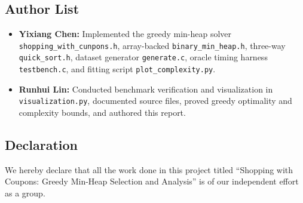 \documentclass[10pt, a4paper]{article}
\newif\ifpeerreview
\newcommand{\code}[1]{\texttt{\color{primary!90!black}#1}}
\begin{document}
\subsection*{Author List}
{\sloppy
\ifpeerreview
\begin{itemize}
  \item \textbf{\color{primary}Student A:} Implemented the greedy min-heap solver \code{shopping\_with\_cunpons.h}, array-backed \code{binary\_min\_heap.h}, three-way \code{quick\_sort.h}, dataset generator \code{generate.c}, oracle timing harness \code{testbench.c}, and fitting script \code{plot\_complexity.py}.
  \item \textbf{\color{primary}Student B:} Conducted benchmark verification and visualization in \code{visualization.py}, documented source files, proved greedy optimality and complexity bounds, and authored this report.
\end{itemize}
\else
\begin{itemize}
  \item \textbf{\color{primary}Yixiang Chen:} Implemented the greedy min-heap solver \code{shopping\_with\_cunpons.h}, array-backed \code{binary\_min\_heap.h}, three-way \code{quick\_sort.h}, dataset generator \code{generate.c}, oracle timing harness \code{testbench.c}, and fitting script \code{plot\_complexity.py}.
  \item \textbf{\color{primary}Runhui Lin:} Conducted benchmark verification and visualization in \code{visualization.py}, documented source files, proved greedy optimality and complexity bounds, and authored this report.
\end{itemize}
\fi
}

\subsection*{Declaration}
We hereby declare that all the work done in this project titled ``Shopping with Coupons: Greedy Min-Heap Selection and Analysis'' is of our independent effort as a group.
\end{document}
